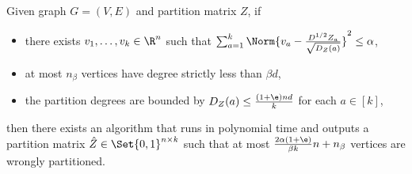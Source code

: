 \begin{lemma}
    \label{lemma:rp_partition_rounding}
    Given graph $G = (V, E)$ and partition matrix $Z$, if
    \begin{itemize}
        \item there exists $v_1, \ldots, v_k \in \R^n$ such that $\sum_{a=1}^k \Norm{v_a - \frac{D^{1/2} Z_a}{\sqrt{D_Z(a)}}}^2 \leq \alpha$,
        \item at most $n_{\beta}$ vertices have degree strictly less than $\beta d$,
        \item the partition degrees are bounded by $D_Z(a) \leq \frac{(1+\e) nd}{k}$ for each $a \in [k]$,
    \end{itemize}
    then there exists an algorithm that runs in polynomial time and outputs a partition matrix $\hat{Z} \in \Set{0,1}^{n \times k}$ such that at most $\frac{2 \alpha (1+\e)}{\beta k} n + n_{\beta}$ vertices are wrongly partitioned.
\end{lemma}

